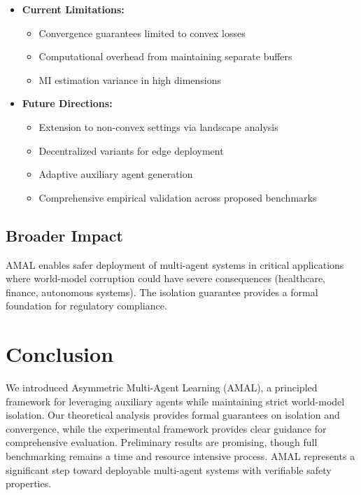 \documentclass[12pt, a4paper]{article}
\begin{document}
\begin{itemize}

\item \textbf{Current Limitations:}
\begin{itemize}
\item Convergence guarantees limited to convex losses
\item Computational overhead from maintaining separate buffers
\item MI estimation variance in high dimensions
\end{itemize}

\item \textbf{Future Directions:}
\begin{itemize}
\item Extension to non-convex settings via landscape analysis
\item Decentralized variants for edge deployment
\item Adaptive auxiliary agent generation
\item Comprehensive empirical validation across proposed benchmarks
\end{itemize}

\end{itemize}

\subsection{Broader Impact}

AMAL enables safer deployment of multi-agent systems in critical applications where world-model corruption could have severe consequences (healthcare, finance, autonomous systems). The isolation guarantee provides a formal foundation for regulatory compliance.

\section{Conclusion}

We introduced Asymmetric Multi-Agent Learning (AMAL), a principled framework for leveraging auxiliary agents while maintaining strict world-model isolation. Our theoretical analysis provides formal guarantees on isolation and convergence, while the experimental framework provides clear guidance for comprehensive evaluation. Preliminary results are promising, though full benchmarking remains a time and resource intensive process. AMAL represents a significant step toward deployable multi-agent systems with verifiable safety properties.
\end{document}
